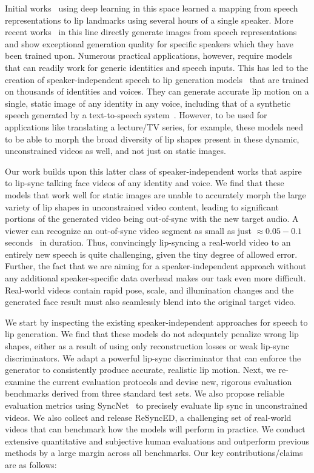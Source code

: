 \documentclass[sigconf]{acmart}
\begin{document}
Initial works~\cite{kumar2017obamanet,suwajanakorn2017synthesizing} using deep learning in this space learned a mapping from speech representations to lip landmarks using several hours of a single speaker. More recent works~\cite{fried2019text,thies2019neural} in this line directly generate images from speech representations and show exceptional generation quality for specific speakers which they have been trained upon. Numerous practical applications, however, require models that can readily work for generic identities and speech inputs. This has led to the creation of speaker-independent speech to lip generation models~\cite{jamaludin2019you,kr2019towards} that are trained on thousands of identities and voices. They can generate accurate lip motion on a single, static image of any identity in any voice, including that of a synthetic speech generated by a text-to-speech system~\cite{kr2019towards}. However, to be used for applications like translating a lecture/TV series, for example, these models need to be able to morph the broad diversity of lip shapes present in these dynamic, unconstrained videos as well, and not just on static images. 

Our work builds upon this latter class of speaker-independent works that aspire to lip-sync talking face videos of any identity and voice. We find that these models that work well for static images are unable to accurately morph the large variety of lip shapes in unconstrained video content, leading to significant portions of the generated video being out-of-sync with the new target audio. A viewer can recognize an out-of-sync video segment as small as just $\approx 0.05 - 0.1$ seconds~\cite{Chung16a} in duration. Thus, convincingly lip-syncing a real-world video to an entirely new speech is quite challenging, given the tiny degree of allowed error. Further, the fact that we are aiming for a speaker-independent approach without any additional speaker-specific data overhead makes our task even more difficult. Real-world videos contain rapid pose, scale, and illumination changes and the generated face result must also seamlessly blend into the original target video. 

We start by inspecting the existing speaker-independent approaches for speech to lip generation. We find that these models do not adequately penalize wrong lip shapes, either as a result of using only reconstruction losses or weak lip-sync discriminators. We adapt a powerful lip-sync discriminator that can enforce the generator to consistently produce accurate, realistic lip motion. Next, we re-examine the current evaluation protocols and devise new, rigorous evaluation benchmarks derived from three standard test sets. We also propose reliable evaluation metrics using SyncNet~\cite{Chung16a} to precisely evaluate lip sync in unconstrained videos. We also collect and release ReSyncED, a challenging set of real-world videos that can benchmark how the models will perform in practice. We conduct extensive quantitative and subjective human evaluations and outperform previous methods by a large margin across all benchmarks. Our key contributions/claims are as follows:
\end{document}
